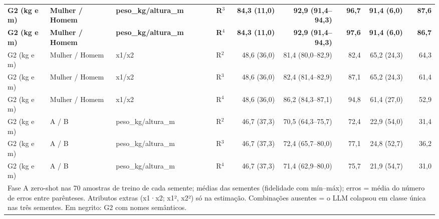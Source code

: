 \begin{table}[htbp]
\begin{tabular}{llllrrrrr}
\textbf{G2 (kg e m)} & \textbf{Mulher / Homem} & \textbf{peso\_kg/altura\_m} & \textbf{R$^3$} & \textbf{84,3 (11,0)} & \textbf{92,9 (91,4–94,3)} & \textbf{96,7} & \textbf{91,4 (6,0)} & \textbf{87,6} \\
\textbf{G2 (kg e m)} & \textbf{Mulher / Homem} & \textbf{peso\_kg/altura\_m} & \textbf{R$^4$} & \textbf{84,3 (11,0)} & \textbf{92,9 (91,4–94,3)} & \textbf{97,6} & \textbf{91,4 (6,0)} & \textbf{86,7} \\
\midrule
G2 (kg e m) & Mulher / Homem & x1/x2 & R$^2$ & 48,6 (36,0) & 81,4 (80,0–82,9) & 82,4 & 65,2 (24,3) & 64,3 \\
G2 (kg e m) & Mulher / Homem & x1/x2 & R$^3$ & 48,6 (36,0) & 82,4 (81,4–82,9) & 87,1 & 65,2 (24,3) & 61,4 \\
G2 (kg e m) & Mulher / Homem & x1/x2 & R$^4$ & 48,6 (36,0) & 86,2 (84,3–87,1) & 94,8 & 61,4 (27,0) & 52,9 \\
\midrule
G2 (kg e m) & A / B & peso\_kg/altura\_m & R$^2$ & 46,7 (37,3) & 70,5 (64,3–75,7) & 72,4 & 22,9 (54,0) & 31,4 \\
G2 (kg e m) & A / B & peso\_kg/altura\_m & R$^3$ & 46,7 (37,3) & 72,4 (65,7–80,0) & 77,1 & 24,8 (52,7) & 36,2 \\
G2 (kg e m) & A / B & peso\_kg/altura\_m & R$^4$ & 46,7 (37,3) & 71,4 (62,9–80,0) & 75,7 & 21,9 (54,7) & 31,0 \\
\bottomrule
\multicolumn{9}{p{0.95\linewidth}}{\footnotesize Fase A zero-shot nas 70 amostras de treino de cada semente; médias das sementes (fidelidade com mín–máx); erros = média do número de erros entre parênteses. Atributos extras (x1·x2; x1², x2²) só na estimação. Combinações ausentes = o LLM colapsou em classe única nas três sementes. Em negrito: G2 com nomes semânticos.} \\
\end{tabular}
\end{table}
